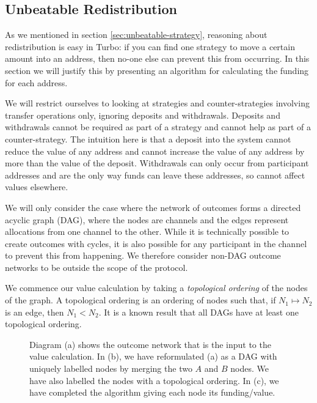 \subsection{Unbeatable Redistribution}

As we mentioned in section \ref{sec:unbeatable-strategy}, reasoning about redistribution is easy in Turbo: if you can find one strategy to move a certain amount into an address, then no-one else can prevent this from occurring.
In this section we will justify this by presenting an algorithm for calculating the funding for each address.

We will restrict ourselves to looking at strategies and counter-strategies involving transfer operations only, ignoring deposits and withdrawals.
Deposits and withdrawals cannot be required as part of a strategy and cannot help as part of a counter-strategy.
The intuition here is that a deposit into the system cannot reduce the value of any address and cannot increase the value of any address by more than the value of the deposit.
Withdrawals can only occur from participant addresses and are the only way funds can leave these addresses, so cannot affect values elsewhere.

We will only consider the case where the network of outcomes forms a directed acyclic graph (DAG), where the nodes are channels and the edges represent allocations from one channel to the other.
While it is technically possible to create outcomes with cycles, it is also possible for any participant in the channel to prevent this from happening.
We therefore consider non-DAG outcome networks to be outside the scope of the protocol.

We commence our value calculation by taking a \textit{topological ordering} of the nodes of the graph.
A topological ordering is an ordering of nodes such that, if $N_1 \mapsto N_2$ is an edge, then $N_1 < N_2$.
It is a known result that all DAGs have at least one topological ordering.

\begin{figure}[h]\centering
  \makebox[\textwidth][c]{}
  \caption{
    Diagram (a) shows the outcome network that is the input to the value calculation.
    In (b), we have reformulated (a) as a DAG with uniquely labelled nodes by merging the two $A$ and $B$ nodes.
    We have also labelled the nodes with a topological ordering.
    In (c), we have completed the algorithm giving each node its funding/value.
  }\label{fig:turbo-redistribution}
\end{figure}

